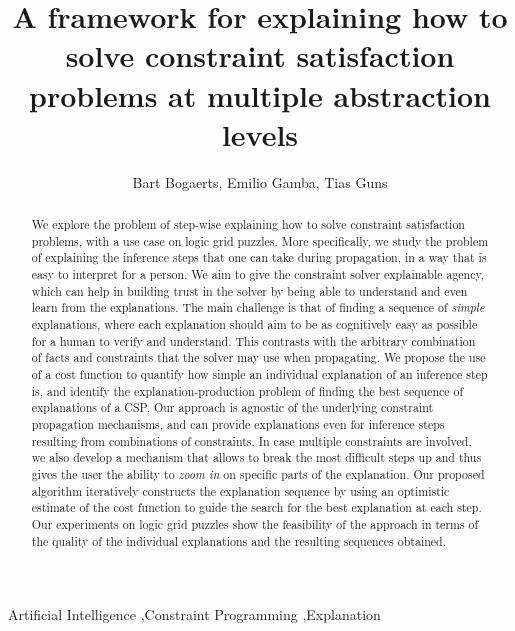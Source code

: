\documentclass[3p]{elsarticle}
\begin{document}
\tableofcontents
\newpage
\begin{frontmatter}

\title{A framework for explaining how to solve constraint satisfaction problems at multiple abstraction levels}

\author[mymainaddress]{Bart Bogaerts, Emilio Gamba, Tias Guns}
\address{Vrije Universiteit Brussel, Pleinlaan 2, 1050 Brussel, Belgium}

\begin{abstract}
We explore the problem of step-wise explaining how to solve constraint satisfaction problems, with a use case on logic grid puzzles.
More specifically, we study the problem of explaining the inference steps that one can take during propagation, in a way that is easy to interpret for a person.
We aim to give the constraint solver explainable agency, which can help in building trust in the solver by being able to understand and even learn from the explanations.
The main challenge is that of finding a sequence of \textit{simple} explanations, where each explanation should aim to be as cognitively easy as possible for a human to verify and understand. 
This contrasts with the arbitrary combination of facts and constraints that the solver may use when propagating.
We propose the use of a cost function to quantify how simple an individual explanation of an inference step is, and identify the explanation-production problem of finding the best sequence of explanations of a CSP. 
Our approach is agnostic of the underlying constraint propagation mechanisms, and can provide explanations even for inference steps resulting from combinations of constraints. 
In case multiple constraints are involved, we also develop a mechanism that allows to break the most difficult steps up and thus gives the user the ability to \emph{zoom in} on specific parts of the explanation. 
Our proposed algorithm iteratively constructs the explanation sequence by using an optimistic estimate of the cost function to guide the search for the best explanation at each step.
Our experiments on logic grid puzzles show the feasibility of the approach in terms of the quality of the individual explanations and the resulting sequences obtained.
\end{abstract}

\begin{keyword}
Artificial Intelligence \sep Constraint Programming \sep Explanation
\end{keyword}

\end{frontmatter}
\end{document}

